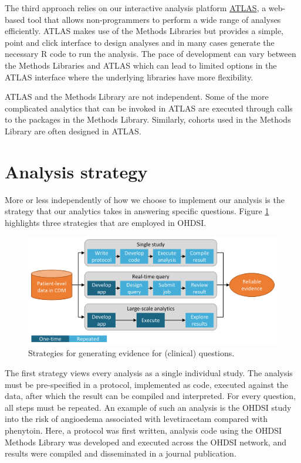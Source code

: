 \documentclass[11pt]{book}
\theoremstyle{definition}
\theoremstyle{definition}
\theoremstyle{definition}
\theoremstyle{remark}
\begin{document}
The third approach relies on our interactive analysis platform \href{https://github.com/OHDSI/Atlas/wiki}{ATLAS}, a web-based tool that allows non-programmers to perform a wide range of analyses efficiently. ATLAS makes use of the Methods Libraries but provides a simple, point and click interface to design analyses and in many cases generate the necessary R code to run the analysis. The pace of development can vary between the Methods Libraries and ATLAS which can lead to limited options in the ATLAS interface where the underlying libraries have more flexibility.

ATLAS and the Methods Library are not independent. Some of the more complicated analytics that can be invoked in ATLAS are executed through calls to the packages in the Methods Library. Similarly, cohorts used in the Methods Library are often designed in ATLAS.

\hypertarget{analysis-strategy}{%
\section{Analysis strategy}\label{analysis-strategy}}

More or less independently of how we choose to implement our analysis is the strategy that our analytics takes in answering specific questions. Figure \ref{fig:strategies} highlights three strategies that are employed in OHDSI.

\begin{figure}

{\centering \includegraphics[width=0.9\linewidth]{images/OhdsiAnalyticsTools/strategies} 

}

\caption{Strategies for generating evidence for (clinical) questions.}\label{fig:strategies}
\end{figure}

The first strategy views every analysis as a single individual study. The analysis must be pre-specified in a protocol, implemented as code, executed against the data, after which the result can be compiled and interpreted. For every question, all steps must be repeated. An example of such an analysis is the OHDSI study into the risk of angioedema associated with levetiracetam compared with phenytoin. \citep{duke_2017} Here, a protocol was first written, analysis code using the OHDSI Methods Library was developed and executed across the OHDSI network, and results were compiled and disseminated in a journal publication.
\end{document}
